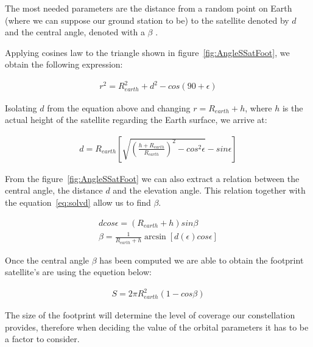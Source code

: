 The most needed parameters are the distance from a random point on Earth (where we can suppose our ground station to be) to the satellite denoted by $d$ and the central angle, denoted with a $\beta$ .
 
Applying cosines law to the triangle shown in figure~\ref{fig:AngleSSatFoot}, we obtain the following expression:
 
\begin{equation} 
\begin{gathered}
r^2=R_{earth}^2+d^2-cos(90+\epsilon)
\end{gathered}
\label{eq:Tcos}
\end{equation}
 
Isolating $d$ from the equation above and changing $r=R_{earth}+h$, where $h$ is the actual height of the satellite regarding the Earth surface, we arrive at:
 
\begin{equation}
\begin{gathered}
d=R_{earth}\left[ \sqrt{\left(\frac{h+R_{earth}}{R_{earth}}\right)^2-cos^2\epsilon}-sin\epsilon\right]
\end{gathered}
\label{eq:solvd}
\end{equation}

From the figure~\ref{fig:AngleSSatFoot} we can also extract a relation between the central angle, the distance $d$ and the elevation angle. This relation together with the equation~\ref{eq:solvd} allow us to find $\beta$. 

\begin{equation}
\begin{gathered}
d cos\epsilon=\left(R_{earth}+h\right)sin\beta \\
\beta=\frac{1}{R_{earth}+h}\arcsin\left[d(\epsilon)cos\epsilon\right]
\end{gathered}
\label{eq:solvb}
\end{equation}

Once the central angle $\beta$ has been computed we are able to obtain the footprint satellite's are using the equetion below:

\begin{equation}
\begin{gathered}
S=2 \pi R_{earth}^2 (1-cos\beta)
\end{gathered}
\label{eq:solvS}
\end{equation}

The size of the footprint will determine the level of coverage our constellation provides, therefore when deciding the value of the orbital parameters it has to be a factor to consider.